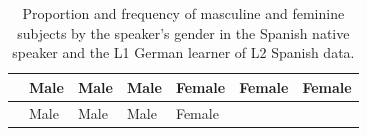 \documentclass[
  letterpaper,
  DIV=11,
  numbers=noendperiod]{scrartcl}
\begin{document}
\begin{longtable}[]{@{}
  >{\raggedright\arraybackslash}p{}
  >{\centering\arraybackslash}p{}
  >{\centering\arraybackslash}p{}
  >{\centering\arraybackslash}p{}
  >{\centering\arraybackslash}p{}
  >{\centering\arraybackslash}p{}
  >{\centering\arraybackslash}p{}@{}}
\caption{Proportion and frequency of masculine and feminine subjects by
the speaker's gender in the Spanish native speaker and the L1 German
learner of L2 Spanish data.}\label{tbl-gender-genus}\tabularnewline
\toprule\noalign{}
\begin{minipage}[b]{\linewidth}\raggedright
\end{minipage} & \begin{minipage}[b]{\linewidth}\centering
Male
\end{minipage} & \begin{minipage}[b]{\linewidth}\centering
Male
\end{minipage} & \begin{minipage}[b]{\linewidth}\centering
Male
\end{minipage} & \begin{minipage}[b]{\linewidth}\centering
Female
\end{minipage} & \begin{minipage}[b]{\linewidth}\centering
Female
\end{minipage} & \begin{minipage}[b]{\linewidth}\centering
Female
\end{minipage} \\
\midrule\noalign{}
\endfirsthead
\toprule\noalign{}
\begin{minipage}[b]{\linewidth}\raggedright
\end{minipage} & \begin{minipage}[b]{\linewidth}\centering
Male
\end{minipage} & \begin{minipage}[b]{\linewidth}\centering
Male
\end{minipage} & \begin{minipage}[b]{\linewidth}\centering
Male
\end{minipage} & \begin{minipage}[b]{\linewidth}\centering
Female

\end{minipage}
\end{longtable}
\end{document}
